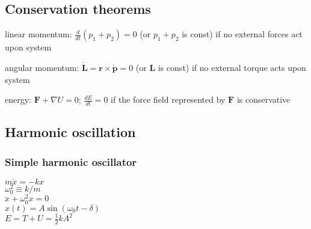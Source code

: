 \documentclass[letterpaper,landscape,10pt]{article}
\newenvironment{mydescription}
{\begin{description}
	\setlength{\itemsep}{0pt}
	\setlength{\parskip}{0pt}
	\setlength{\parsep}{-1pt}}
{\end{description}}
\begin{document}
{\begin{multicols}{3}
	
	\subsection*{Conservation theorems}
		\begin{mydescription}
			\item[linear momentum:]
				$\frac{d}{dt}\left(p_1 + p_2\right) = 0$ (or $p_1+p_2$ is const)
				if no external forces act upon system  \\
			\item[angular momentum:]
				$\dot{\mathbf{L}}=\mathbf{r}\times\dot{\mathbf{p}}=0$ (or $\mathbf{L}$ is
				const) if no external torque acts upon system \\
			\item[energy:]
				$\mathbf{F}+\nabla U = 0$; $\frac{dE}{dt} = 0$ if the force field
				represented by $\mathbf{F}$ is conservative
		\end{mydescription}
	
	\subsection*{Harmonic oscillation}
	\subsubsection*{Simple harmonic oscillator}
		{\centering
		$m\ddot{x} = -kx$  \\
		$\omega_0^2 \equiv k/m$  \\
		$\ddot{x} + \omega_0^2x = 0$  \\
		$x(t) = A\sin (\omega_0 t - \delta)$  \\
		$E = T + U = \frac{1}{2}kA^2$ \\
	
}
\end{multicols}}
\end{document}
